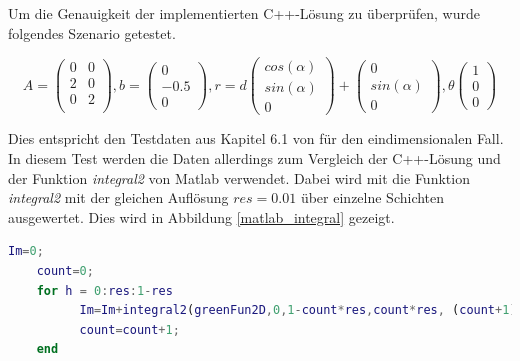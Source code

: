 Um die Genauigkeit der implementierten C++-Lösung zu überprüfen, wurde folgendes Szenario getestet.


\begin{equation}
  A = \begin{pmatrix}
      0 & 0 \\
      2 & 0 \\
      0 & 2 \\
  \end{pmatrix}, b = \begin{pmatrix}
      0 \\ -0.5\\ 0
  \end{pmatrix},
  r = d \begin{pmatrix}
      cos(\alpha) \\ sin(\alpha) \\ 0
  \end{pmatrix} + \begin{pmatrix}
    0 \\ sin(\alpha) \\ 0
\end{pmatrix}, \theta \begin{pmatrix}
   1 \\ 0 \\ 0
\end{pmatrix}
\end{equation}

Dies entspricht den Testdaten aus Kapitel 6.1 von \cite{gasperini:hal-03209144} für den eindimensionalen Fall. 
In diesem Test werden die Daten allerdings zum Vergleich der C++-Lösung und der Funktion \textit{integral2} von Matlab verwendet.
Dabei wird mit die Funktion \textit{integral2} mit der gleichen Auflösung $res=0.01$ über einzelne Schichten ausgewertet.
Dies wird in Abbildung \ref{matlab_integral} gezeigt. 
\begin{center}
  \begin{lstlisting}[language=MATLAB, breaklines]
    Im=0;
    count=0;
    for h = 0:res:1-res
          Im=Im+integral2(greenFun2D,0,1-count*res,count*res, (count+1)*res,'AbsTol',10^(-16),'RelTol',1e-8);
          count=count+1;      
    end
  \end{lstlisting}
  \label{matlab_integral}
\end{center}



